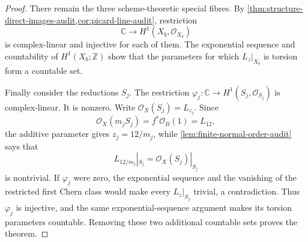 \begin{proof}
There remain the three scheme-theoretic special fibres.  By
\cref{thm:structure-direct-images-audit,cor:picard-line-audit}, restriction
\[
 \mathbb C\longrightarrow H^1(X_b,\mathcal O_{X_b})
\]
is complex-linear and injective for each of them.  The exponential sequence
and countability of \(H^1(X_b;\mathbb Z)\) show that the parameters for
which \(L_z|_{X_b}\) is torsion form a countable set.

Finally consider the reductions \(S_j\).  The restriction
\(\varphi_j:\mathbb C\to H^1(S_j,\mathcal O_{S_j})\) is complex-linear.
It is nonzero.  Write \(\mathcal O_X(S_j)=L_{z_j}\).  Since
\[
 \mathcal O_X(m_jS_j)=f^*\mathcal O_B(1)=L_{12},
\]
the additive parameter gives \(z_j=12/m_j\), while
\cref{lem:finite-normal-order-audit} says that
\[
 L_{12/m_j}|_{S_j}=\mathcal O_X(S_j)|_{S_j}
\]
is nontrivial.  If \(\varphi_j\) were zero, the exponential sequence and
the vanishing of the restricted first Chern class would make every
\(L_z|_{S_j}\) trivial, a contradiction.  Thus \(\varphi_j\) is
injective, and the same exponential-sequence argument makes its torsion
parameters countable.  Removing these two additional countable sets proves
the theorem.
\end{proof}
